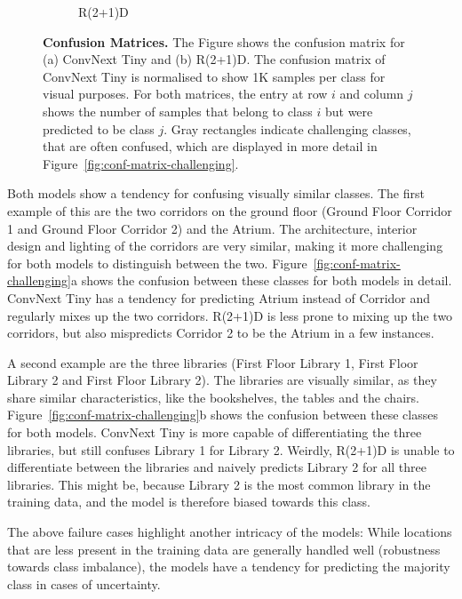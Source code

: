 \documentclass[a4paper]{article}
\begin{document}
\begin{figure}
\begin{subfigure}[b]{0.49\textwidth}
    \caption{R(2+1)D}
  \end{subfigure}
  \caption{
    \textbf{Confusion Matrices.} The Figure shows the confusion matrix for (a)
    ConvNext Tiny and (b) R(2+1)D. The confusion matrix of ConvNext Tiny is
    normalised to show 1K samples per class for visual purposes. For both
    matrices, the entry at row $i$ and column $j$ shows the number of samples
    that belong to class $i$ but were predicted to be class $j$. Gray
    rectangles indicate challenging classes, that are often confused, which are
    displayed in more detail in Figure~\ref{fig:conf-matrix-challenging}.
  }
  \label{fig:conf-matrix}
\end{figure}

Both models show a tendency for confusing visually similar classes. 
The first example of this are the two corridors on the ground floor (Ground Floor
Corridor 1 and Ground Floor Corridor 2) and the Atrium. The architecture,
interior design and lighting of the corridors are very similar, making it more
challenging for both models to distinguish between the two.
Figure~\ref{fig:conf-matrix-challenging}a shows the confusion between these
classes for both models in detail. ConvNext Tiny has a tendency for predicting
Atrium instead of Corridor and regularly mixes up the two corridors. R(2+1)D
is less prone to mixing up the two corridors, but also mispredicts Corridor 2 to
be the Atrium in a few instances.

A second example are the three libraries (First Floor Library 1, First Floor
Library 2 and First Floor Library 2). The libraries are visually similar, as
they share similar characteristics, like the bookshelves, the tables and the
chairs. Figure~\ref{fig:conf-matrix-challenging}b shows the confusion between
these classes for both models. ConvNext Tiny is more capable of differentiating
the three libraries, but still confuses Library 1 for Library 2. Weirdly, R(2+1)D 
is unable to differentiate between the libraries and naively predicts Library 2
for all three libraries. This might be, because Library 2 is the most common 
library in the training data, and the model is therefore biased towards this
class.

The above failure cases highlight another intricacy of the models: While
locations that are less present in the training data are generally handled well
(robustness towards class imbalance), the models have a tendency for predicting
the majority class in cases of uncertainty.
\end{document}
